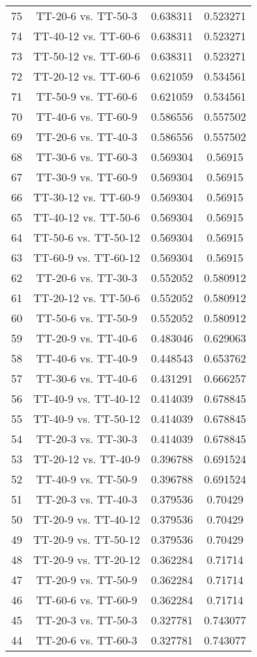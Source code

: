 \documentclass[a4paper,10pt]{article}
\begin{document}
\begin{landscape}
\begin{table}[!htp]
\begin{tabular}{cccc}
75&TT-20-6 vs. TT-50-3&0.638311&0.523271\\
74&TT-40-12 vs. TT-60-6&0.638311&0.523271\\
73&TT-50-12 vs. TT-60-6&0.638311&0.523271\\
72&TT-20-12 vs. TT-60-6&0.621059&0.534561\\
71&TT-50-9 vs. TT-60-6&0.621059&0.534561\\
70&TT-40-6 vs. TT-60-9&0.586556&0.557502\\
69&TT-20-6 vs. TT-40-3&0.586556&0.557502\\
68&TT-30-6 vs. TT-60-3&0.569304&0.56915\\
67&TT-30-9 vs. TT-60-9&0.569304&0.56915\\
66&TT-30-12 vs. TT-60-9&0.569304&0.56915\\
65&TT-40-12 vs. TT-50-6&0.569304&0.56915\\
64&TT-50-6 vs. TT-50-12&0.569304&0.56915\\
63&TT-60-9 vs. TT-60-12&0.569304&0.56915\\
62&TT-20-6 vs. TT-30-3&0.552052&0.580912\\
61&TT-20-12 vs. TT-50-6&0.552052&0.580912\\
60&TT-50-6 vs. TT-50-9&0.552052&0.580912\\
59&TT-20-9 vs. TT-40-6&0.483046&0.629063\\
58&TT-40-6 vs. TT-40-9&0.448543&0.653762\\
57&TT-30-6 vs. TT-40-6&0.431291&0.666257\\
56&TT-40-9 vs. TT-40-12&0.414039&0.678845\\
55&TT-40-9 vs. TT-50-12&0.414039&0.678845\\
54&TT-20-3 vs. TT-30-3&0.414039&0.678845\\
53&TT-20-12 vs. TT-40-9&0.396788&0.691524\\
52&TT-40-9 vs. TT-50-9&0.396788&0.691524\\
51&TT-20-3 vs. TT-40-3&0.379536&0.70429\\
50&TT-20-9 vs. TT-40-12&0.379536&0.70429\\
49&TT-20-9 vs. TT-50-12&0.379536&0.70429\\
48&TT-20-9 vs. TT-20-12&0.362284&0.71714\\
47&TT-20-9 vs. TT-50-9&0.362284&0.71714\\
46&TT-60-6 vs. TT-60-9&0.362284&0.71714\\
45&TT-20-3 vs. TT-50-3&0.327781&0.743077\\
44&TT-20-6 vs. TT-60-3&0.327781&0.743077\\

\end{tabular}
\end{table}
\end{landscape}
\end{document}
